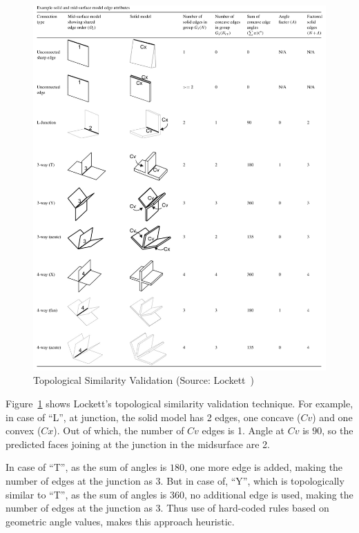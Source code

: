 \begin{figure}[!h]
\centering     %
\includegraphics[width=\linewidth,valign=t]{images/locketttopoval}
\caption{Topological Similarity Validation (Source: Lockett~\cite{Lockett2008})}
\label{fig:litsurvey:locketttopoval}
\end{figure}


Figure~\ref{fig:litsurvey:locketttopoval} shows Lockett's topological similarity validation technique. For example, in case of ``L'', at junction, the solid model has 2 edges, one concave ($Cv$) and one convex ($Cx$). Out of which, the number of $Cv$ edges is 1. Angle at $Cv$ is $90$, so the predicted faces joining at the junction in the midsurface are 2. 

In case of ``T'', as the sum of angles is $180$, one more edge is added, making the number of edges at the junction as 3. But in case of, ``Y'', which is topologically similar to ``T'', as the sum of angles is $360$, no additional edge is used, making the number of edges at the junction as 3. Thus use of hard-coded rules based on geometric angle values, makes this approach heuristic.

